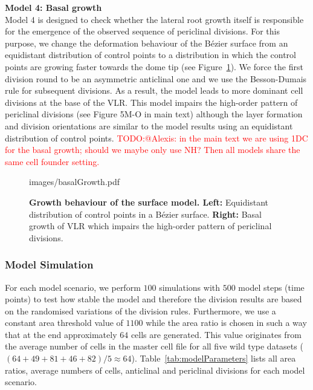 \documentclass[11pt,a4paper, final]{article}
\newcommand{\TODO}[1]{
\textcolor{red}{TODO:#1}
}
\begin{document}
\noindent
\textbf{Model 4: Basal growth}\\
\noindent
Model 4 is designed to check whether the lateral root growth itself is responsible for the emergence of the observed sequence of periclinal divisions. For this purpose, we change the deformation behaviour of the B\'ezier surface from an equidistant distribution of control points to a distribution in which the control points are growing faster towards the dome tip (see Figure~\ref{fig:basalGrowth}). We force the first division round to be an asymmetric anticlinal one and we use the Besson-Dumais rule for subsequent divisions. As a result, the model leads to more dominant cell divisions at the base of the VLR. This model impairs the high-order pattern of periclinal divisions (see Figure 5M-O in main text) although the layer formation and division orientations are similar to the model results using an equidistant distribution of control points. \TODO{@Alexis: in the main text we are using 1DC for the basal growth; should we maybe only use NH? Then all models share the same cell founder setting.}
%
\begin{figure}[htbp]
	\begin{center}
		\begin{overpic}[width=1.\linewidth]{images/basalGrowth.pdf}
		\end{overpic}
\caption[]
{
{\bf Growth behaviour of the surface model. Left:} Equidistant distribution of control points in a B\'ezier surface. \textbf{Right:} Basal growth of VLR which impairs the high-order pattern of periclinal divisions.
}
	\label{fig:basalGrowth}
	\end{center}
\end{figure}
%

\subsubsection{Model Simulation}
\noindent
For each model scenario, we perform $100$ simulations with $500$ model steps (time points) to test how stable the model and therefore the division results are based on the randomised variations of the division rules. Furthermore, we use a constant area threshold value of $1100$ while the area ratio is chosen in such a way that at the end approximately $64$ cells are generated. This value originates from the average number of cells in the master cell file for all five wild type datasets ($(64+49+81+46+82)/5 \approx 64$). Table~\ref{tab:modelParameters} lists all area ratios, average numbers of cells, anticlinal and periclinal divisions for each model scenario.
\end{document}
